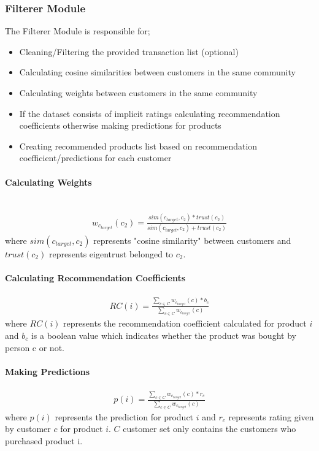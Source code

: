 	\subsubsection{Filterer Module} The Filterer Module is responsible for;
	\begin{itemize}
		\item Cleaning/Filtering the provided transaction list (optional)
		\item Calculating cosine similarities between customers in the same community
		\item Calculating weights between customers in the same community
		\item If the dataset consists of implicit ratings calculating recommendation coefficients otherwise making predictions for products
		\item Creating recommended products list based on recommendation coefficient/predictions for each customer
	\end{itemize}

	\paragraph{Calculating Weights} \mbox{}\\
	\begin{equation*} 
	\begin{split}
	w_{c_{target}}(c_{2}) = \frac{sim(c_{target},c_{2})*trust(c_{2})}{sim(c_{target},c_{2})+trust(c_{2})}
	\end{split}
	\end{equation*}
	where $sim(c_{target},c_{2})$ represents "cosine similarity" between customers and $trust(c_{2})$ represents eigentrust belonged to $c_{2}$.

	\paragraph{Calculating Recommendation Coefficients}	
	\begin{equation*} 
	\begin{split}
	RC(i) = \frac{\sum_{c \in C}^{} w_{c_{target}}(c)*b_{c}}{\sum_{c \in C}^{} w_{c_{target}}(c)}
	\end{split}
	\end{equation*}
	where $RC(i)$ represents the recommendation coefficient calculated for product $i$ and $b_{c}$ is a boolean value which indicates whether the product was bought by person c or not.


	\paragraph{Making Predictions}
	\begin{equation*} 
	\begin{split}
	p(i) = \frac{\sum_{c \in C}^{} w_{c_{target}}(c)*r_{c}}{\sum_{c \in C}^{} w_{c_{target}}(c)}
	\end{split}
	\end{equation*}
	where $p(i)$ represents the prediction for product $i$ and $r_{c}$ represents rating given by customer $c$ for product $i$. $C$ customer set only contains the customers who purchased product i. \\
	
